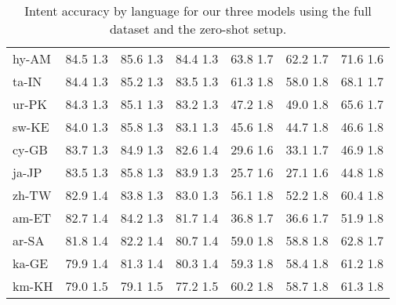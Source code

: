 \documentclass[11pt]{article}
\begin{document}
\begin{table*}[]
{\begin{tabular}{lcccccc}
hy-AM & 84.5  1.3 & 85.6  1.3 & 84.4  1.3 & 63.8  1.7 & 62.2  1.7 & 71.6  1.6 \\
ta-IN & 84.4  1.3 & 85.2  1.3 & 83.5  1.3 & 61.3  1.8 & 58.0  1.8 & 68.1  1.7 \\
ur-PK & 84.3  1.3 & 85.1  1.3 & 83.2  1.3 & 47.2  1.8 & 49.0  1.8 & 65.6  1.7 \\
sw-KE & 84.0  1.3 & 85.8  1.3 & 83.1  1.3 & 45.6  1.8 & 44.7  1.8 & 46.6  1.8 \\
cy-GB & 83.7  1.3 & 84.9  1.3 & 82.6  1.4 & 29.6  1.6 & 33.1  1.7 & 46.9  1.8 \\
ja-JP & 83.5  1.3 & 85.8  1.3 & 83.9  1.3 & 25.7  1.6 & 27.1  1.6 & 44.8  1.8 \\
zh-TW & 82.9  1.4 & 83.8  1.3 & 83.0  1.3 & 56.1  1.8 & 52.2  1.8 & 60.4  1.8 \\
am-ET & 82.7  1.4 & 84.2  1.3 & 81.7  1.4 & 36.8  1.7 & 36.6  1.7 & 51.9  1.8 \\
ar-SA & 81.8  1.4 & 82.2  1.4 & 80.7  1.4 & 59.0  1.8 & 58.8  1.8 & 62.8  1.7 \\
ka-GE & 79.9  1.4 & 81.3  1.4 & 80.3  1.4 & 59.3  1.8 & 58.4  1.8 & 61.2  1.8 \\
km-KH & 79.0  1.5 & 79.1  1.5 & 77.2  1.5 & 60.2  1.8 & 58.7  1.8 & 61.3  1.8 \\

\bottomrule
\end{tabular}
}
\caption{Intent accuracy by language for our three models using the full dataset and the zero-shot setup.}
\label{tab:all_intent_acc}
\end{table*}
\end{document}
